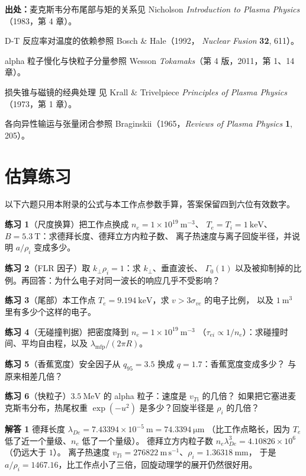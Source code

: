 {\footnotesize
\textbf{出处：}麦克斯韦分布尾部与矩的关系见 Nicholson \emph{Introduction to Plasma Physics}
（1983，第 4 章）。

D-T 反应率对温度的依赖参照 Bosch \& Hale（1992，
\emph{Nuclear Fusion} \textbf{32}, 611）。

alpha 粒子慢化与快粒子分量参照
Wesson \emph{Tokamaks}（第 4 版，2011，第 1、14 章）。

损失锥与磁镜的经典处理
见 Krall \& Trivelpiece \emph{Principles of Plasma Physics}（1973，第 1 章）。

各向异性输运与张量闭合参照 Braginskii（1965，\emph{Reviews of Plasma Physics} \textbf{1}, 205）。
\section{估算练习}
\label{sec:app-ae-problems}
}

以下六题只用本附录的公式与本工作点参数手算，答案保留四到六位有效数字。

\textbf{练习 1}（尺度换算）把工作点换成 $n_e=1\times10^{19}\ \mathrm{m^{-3}}$、
$T_e=T_i=1\ \mathrm{keV}$、$B=5.3\ \mathrm{T}$：求德拜长度、德拜立方内粒子数、
离子热速度与离子回旋半径，并说明 $a/\rho_i$ 变成多少。

\textbf{练习 2}（FLR 因子）取 $k_\perp\rho_i=1$：求 $k_\perp$、垂直波长、
$\Gamma_0(1)$ 以及被抑制掉的比例。再回答：为什么电子对同一波长的响应几乎不受影响？

\textbf{练习 3}（尾部）本工作点 $T_e=9.194\ \mathrm{keV}$，求 $v>3\sigma_{ve}$ 的电子比例，
以及 $1\ \mathrm{m^3}$ 里有多少个这样的电子。

\textbf{练习 4}（无碰撞判据）把密度降到 $n_e=1\times10^{19}\ \mathrm{m^{-3}}$
（$\tau_{ei}\propto1/n_e$）：求碰撞时间、平均自由程，以及 $\lambda_{\mathrm{mfp}}/(2\pi R)$。

\textbf{练习 5}（香蕉宽度）安全因子从 $q_{95}=3.5$ 换成 $q=1.7$：香蕉宽度变成多少？
与原来相差几倍？

\textbf{练习 6}（快粒子）$3.5\ \mathrm{MeV}$ 的 alpha 粒子：速度是 $v_{Ti}$ 的几倍？
如果把它塞进麦克斯韦分布，热尾权重 $\exp(-u^2)$ 是多少？回旋半径是 $\rho_i$ 的几倍？

\textbf{解答 1} 德拜长度 $\lambda_{De}=7.43394\times10^{-5}\ \mathrm{m}=74.3394\ \mathrm{\mu m}$
（比工作点略长，因为 $T_e$ 低了近一个量级、$n_e$ 低了一个量级）。
德拜立方内粒子数 $n_e\lambda_{De}^3=4.10826\times10^{6}$（仍远大于 $1$）。
离子热速度 $v_{Ti}=276822\ \mathrm{m\,s^{-1}}$、$\rho_i=1.36318\ \mathrm{mm}$，
于是 $a/\rho_i=1467.16$，比工作点小了三倍，回旋动理学的展开仍然很好用。

